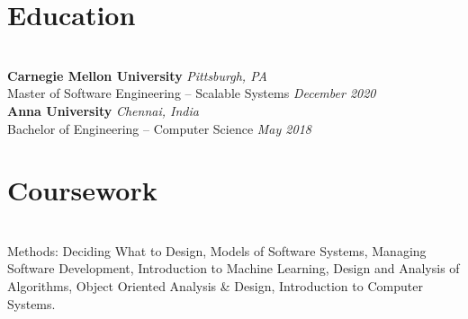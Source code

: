 \documentclass{resume}
\author{https://aravindvasu.dev}{Aravind Vasudevan}
\begin{document}
\maketitle
\section*{Education}
\titlerule
\noindent
\\
\textbf{Carnegie Mellon University} \hfill \textit{Pittsburgh, PA} \\
{\small Master of Software Engineering -- Scalable Systems} \hfill \textit{\small December 2020}\\
\textbf{Anna University} \hfill \textit{Chennai, India} \\
{\small Bachelor of Engineering -- Computer Science} \hfill \textit{\small May 2018}

\section*{Coursework}
\titlerule
\noindent
\\
Methods: Deciding What to Design, Models of Software Systems, Managing Software Development, Introduction to Machine Learning, Design and Analysis of Algorithms, Object Oriented Analysis \& Design, Introduction to Computer Systems.
\end{document}
